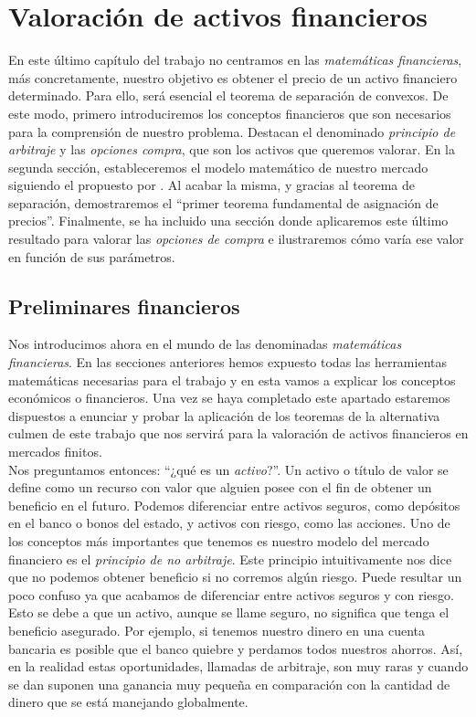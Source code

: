 \chapter{Valoración de activos financieros}
En este último capítulo del trabajo no centramos en las \textit{matemáticas financieras}, más concretamente, nuestro objetivo es obtener el precio de un activo financiero determinado. Para ello, será esencial el teorema de separación de convexos. De este modo, primero introduciremos los conceptos financieros que son necesarios para la comprensión de nuestro problema. Destacan el denominado \textit{principio de arbitraje} y las \textit{opciones compra}, que son los activos que queremos valorar. En la segunda sección, estableceremos el modelo matemático de nuestro mercado siguiendo el propuesto por \cite{elliot1999mathematics}. Al acabar la misma, y gracias al teorema de separación, demostraremos el ``primer teorema fundamental de asignación de precios''. Finalmente, se ha incluido una sección donde aplicaremos este último resultado para valorar las \textit{opciones de compra} e ilustraremos cómo varía ese valor en función de sus parámetros.

\section{Preliminares financieros}
Nos introducimos ahora en el mundo de las denominadas \textit{matemáticas financieras}. En las secciones anteriores hemos expuesto todas las herramientas matemáticas necesarias para el trabajo y en esta vamos a explicar los conceptos económicos o financieros. Una vez se haya completado este apartado estaremos dispuestos a enunciar y probar la aplicación de los teoremas de la alternativa culmen de este trabajo que nos servirá para la valoración de activos financieros en mercados finitos. \\

Nos preguntamos entonces: ``¿qué es un \textit{activo}?''. Un activo o título de valor se define como un recurso con valor que alguien posee con el fin de obtener un beneficio en el futuro. Podemos diferenciar entre activos seguros, como depósitos en el banco o bonos del estado, y activos con riesgo, como las acciones. Uno de los conceptos más importantes que tenemos es nuestro modelo del mercado financiero es el \textit{principio de no arbitraje}. Este principio intuitivamente nos dice que no podemos obtener beneficio si no corremos algún riesgo. Puede resultar un poco confuso ya que acabamos de diferenciar entre activos seguros y con riesgo. Esto se debe a que un activo, aunque se llame seguro, no significa que tenga el  beneficio asegurado. Por ejemplo, si tenemos nuestro dinero en una cuenta bancaria es posible que el banco quiebre y perdamos todos nuestros ahorros. Así, en la realidad estas oportunidades, llamadas de arbitraje, son muy raras y cuando se dan suponen una ganancia muy pequeña en comparación con la cantidad de dinero que se está manejando globalmente.\\

